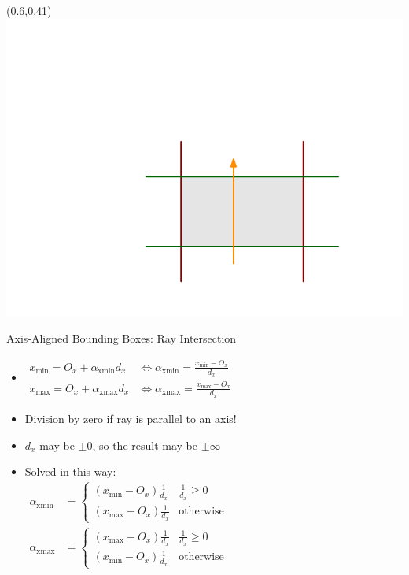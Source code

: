 \documentclass[utf8,stillsansserifmath,fleqn,t]{beamer}
\begin{document}
\begin{frame}[fragile]
\frametitle{\insertsection}
\begin{textblock}{0.4}(0.6,0.41) \includegraphics[width=\textwidth]{./fig/aabb-ray-1.pdf} \end{textblock}
Axis-Aligned Bounding Boxes: Ray Intersection
\begin{itemize}
\item
$\begin{aligned}
x_{\min} = O_x + \alpha_\text{xmin} d_x &\iff \alpha_\text{xmin} = \frac{x_{\min} - O_x}{d_x}\\
x_{\max} = O_x + \alpha_\text{xmax} d_x &\iff \alpha_\text{xmax} = \frac{x_{\max} - O_x}{d_x}
\end{aligned}$
\item Division by zero if ray is parallel to an axis!
\item $d_x$ may be $\pm 0$, so the result may be $\pm \infty$
\item Solved in this way:\\
$\begin{aligned}
\alpha_\text{xmin} &= \begin{cases}(x_{\min} - O_x)\frac{1}{d_x} & \frac{1}{d_x} \geq 0\\(x_{\max} - O_x)\frac{1}{d_x} & \text{otherwise}\end{cases}\\
\alpha_\text{xmax} &= \begin{cases}(x_{\max} - O_x)\frac{1}{d_x} & \frac{1}{d_x} \geq 0\\(x_{\min} - O_x)\frac{1}{d_x} & \text{otherwise}\end{cases}\\
\end{aligned}$
\end{itemize}
\end{frame}
\end{document}
